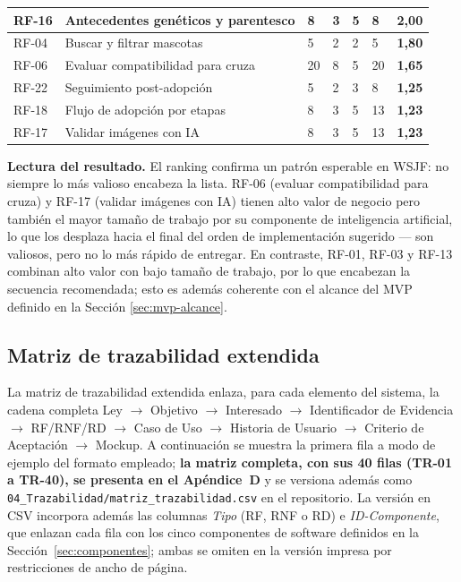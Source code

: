 \documentclass[journal,onecolumn]{IEEEtran}
\begin{document}
\begin{longtable}{@{}p{1.4cm} p{5.4cm} p{1.5cm} p{1.5cm} p{1.5cm} p{1.5cm} p{1.3cm}@{}}
		\hline
		RF-16 & Antecedentes genéticos y parentesco & 8 & 3 & 5 & 8 & \textbf{2,00} \\
		\hline
		RF-04 & Buscar y filtrar mascotas & 5 & 2 & 2 & 5 & \textbf{1,80} \\
		\hline
		RF-06 & Evaluar compatibilidad para cruza & 20 & 8 & 5 & 20 & \textbf{1,65} \\
		\hline
		RF-22 & Seguimiento post-adopción & 5 & 2 & 3 & 8 & \textbf{1,25} \\
		\hline
		RF-18 & Flujo de adopción por etapas & 8 & 3 & 5 & 13 & \textbf{1,23} \\
		\hline
		RF-17 & Validar imágenes con IA & 8 & 3 & 5 & 13 & \textbf{1,23} \\
	\end{longtable}
	
	\textbf{Lectura del resultado.} El ranking confirma un patrón esperable en
	WSJF: no siempre lo más valioso encabeza la lista. RF-06 (evaluar
	compatibilidad para cruza) y RF-17 (validar imágenes con IA) tienen alto
	valor de negocio pero también el mayor tamaño de trabajo por su componente
	de inteligencia artificial, lo que los desplaza hacia el final del orden de
	implementación sugerido --- son valiosos, pero no lo más rápido de
	entregar. En contraste, RF-01, RF-03 y RF-13 combinan alto valor con bajo
	tamaño de trabajo, por lo que encabezan la secuencia recomendada; esto es
	además coherente con el alcance del MVP definido en la Sección
	\ref{sec:mvp-alcance}.
	
	\subsection{Matriz de trazabilidad extendida}
	\label{sec:trazabilidad}
	
	La matriz de trazabilidad extendida enlaza, para cada elemento del sistema,
	la cadena completa Ley $\rightarrow$ Objetivo $\rightarrow$ Interesado
	$\rightarrow$ Identificador de Evidencia $\rightarrow$ RF/RNF/RD
	$\rightarrow$ Caso de Uso $\rightarrow$ Historia de Usuario
	$\rightarrow$ Criterio de Aceptación $\rightarrow$ Mockup. A continuación se
	muestra la primera fila a modo de ejemplo del formato empleado;
	\textbf{la matriz completa, con sus 40 filas (TR-01 a TR-40), se presenta en
		el Apéndice~D} y se versiona además como
	\texttt{04\_Trazabilidad/matriz\_trazabilidad.csv} en el repositorio. La
	versión en CSV incorpora además las columnas \emph{Tipo} (RF, RNF o RD) e
	\emph{ID-Componente}, que enlazan cada fila con los cinco componentes de
	software definidos en la Sección~\ref{sec:componentes}; ambas se omiten en la
	versión impresa por restricciones de ancho de página.
	
\end{document}
